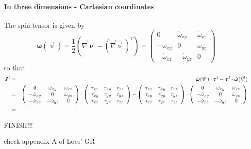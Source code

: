 \paragraph{In three dimensions - Cartesian coordinates}
The spin tensor is given by 
\[
\dot{\bm \omega}(\vec\upnu) 
= \frac{1}{2}\left( \vec\nabla\vec \upnu - (\vec\nabla \vec\upnu)^T \right)
= 
\left( \begin{array}{ccc}
0 & \dot{\omega}_{xy} & \dot{\omega}_{xz}\\
-\dot{\omega}_{xy} & 0 & \dot{\omega}_{yz} \\
-\dot{\omega}_{xz} & -\dot{\omega}_{yz} & 0
\end{array}\right)
\]
so that 
\begin{eqnarray}
{\bm J}^t 
&=& \dot{\bm \omega}(\vec\upnu^t) \cdot {\bm \tau}^t - {\bm \tau}^t \cdot \dot{\bm \omega}(\vec\upnu^t)  \nonumber\\
&=&
\left( \begin{array}{ccc}
0 & \dot{\omega}_{xy} & \dot{\omega}_{xz}\\
-\dot{\omega}_{xy} & 0 & \dot{\omega}_{yz} \\
-\dot{\omega}_{xz} & -\dot{\omega}_{yz} & 0
\end{array}\right)
\cdot
\left( \begin{array}{ccc}
\tau_{xx} & \tau_{xy} & \tau_{xz}\\
\tau_{xy} & \tau_{yy} & \tau_{yz}\\
\tau_{xz} & \tau_{yz} & \tau_{zz}
\end{array}\right)
-
\left( \begin{array}{ccc}
\tau_{xx} & \tau_{xy} & \tau_{xz}\\
\tau_{xy} & \tau_{yy} & \tau_{yz}\\
\tau_{xz} & \tau_{yz} & \tau_{zz}
\end{array}\right)
\cdot
\left( \begin{array}{ccc}
0 & \dot{\omega}_{xy} & \dot{\omega}_{xz}\\
-\dot{\omega}_{xy} & 0 & \dot{\omega}_{yz} \\
-\dot{\omega}_{xz} & -\dot{\omega}_{yz} & 0
\end{array}\right)
\nonumber\\
&=&
\end{eqnarray}

FINISH!!!


check appendix A of Loes' GR 
